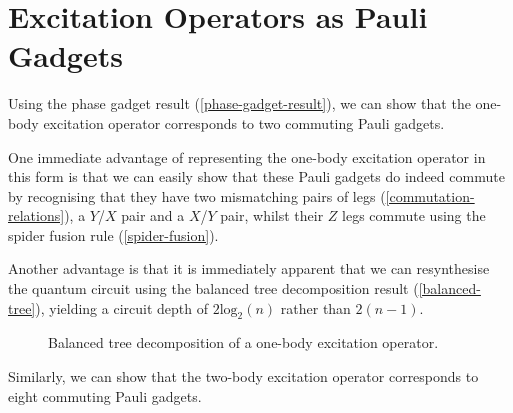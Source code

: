 \section{Excitation Operators as Pauli Gadgets}

Using the phase gadget result (\ref{phase-gadget-result}), we can show that the one-body excitation operator corresponds to two commuting Pauli gadgets.


One immediate advantage of representing the one-body excitation operator in this form is that we can easily show that these Pauli gadgets do indeed commute by recognising that they have two mismatching pairs of legs (\ref{commutation-relations}), a $Y$/$X$ pair and a $X$/$Y$ pair, whilst their $Z$ legs commute using the spider fusion rule (\ref{spider-fusion}).

Another advantage is that it is immediately apparent that we can resynthesise the quantum circuit using the balanced tree decomposition result (\ref{balanced-tree}), yielding a circuit depth of $2\text{log}_2(n)$ rather than $2(n-1)$.

\begin{figure}[H]
    \centering
    \caption{Balanced tree decomposition of a one-body excitation operator.}
\end{figure}

Similarly, we can show that the two-body excitation operator corresponds to eight commuting Pauli gadgets.

